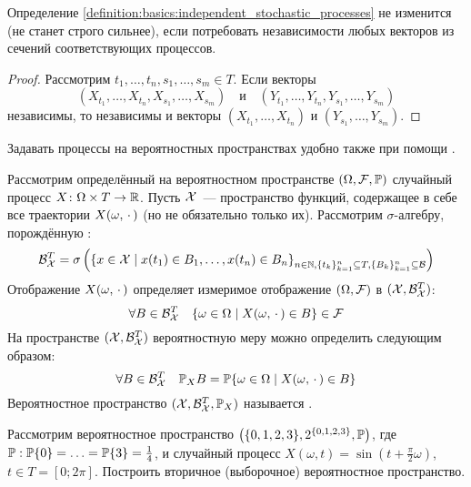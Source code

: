 \begin{remark}
    \label{remark:basics:independent_stochastic_processes}
    Определение \ref{definition:basics:independent_stochastic_processes} не изменится (не станет строго сильнее),
    если потребовать независимости любых векторов из сечений соответствующих процессов.
\end{remark}

\begin{proof}
    Рассмотрим $ t_1, \ldots, t_n, s_1, \ldots, s_m \in T $.
    Если векторы
    \[
        (X_{t_1}, \ldots, X_{t_n}, X_{s_1}, \ldots, X_{s_m}) \quad \text{и} \quad (Y_{t_1}, \ldots, Y_{t_n}, Y_{s_1}, \ldots, Y_{s_m})
    \]
    независимы, то независимы и векторы $ (X_{t_1}, \ldots, X_{t_n}) $ и $ (Y_{s_1}, \ldots, Y_{s_m}) $.
\end{proof}

Задавать процессы на вероятностных пространствах удобно также при помощи .

\begin{definition}
    \label{definition:basics:sampling_space}
    Рассмотрим определённый на вероятностном пространстве $ (\Omega, \mathcal{F}, \mathbb{P}) $ случайный процесс $ X \colon \Omega \times T \to \mathbb{R} $.
    Пусть $ \mathcal{X} $~--- пространство функций, содержащее в себе все траектории $ X(\omega, \, \cdot \,) $ (но не обязательно только их).
    Рассмотрим $ \sigma $-алгебру, порождённую :
    \[
        \mathcal{B}_{\mathcal{X}}^T =
        \sigma\left( \left\{ x \in \mathcal{X} \mid x(t_1) \in B_1, \ldots, x(t_n) \in B_n \right\}_{n \in \mathbb{N}, \{t_k\}_{k=1}^n \subseteq T, \{B_k\}_{k=1}^n \subseteq \mathcal{B}} \right)
    \]
    Отображение $ X(\omega, \, \cdot \,) $ определяет измеримое отображение $ (\Omega, \mathcal{F}) $ в $ (\mathcal{X}, \mathcal{B}_{\mathcal{X}}^T) $:
    \[
        \forall B \in \mathcal{B}_{\mathcal{X}}^T \quad \{ \omega \in \Omega \mid X(\omega, \, \cdot \,) \in B \} \in \mathcal{F}
    \]
    На пространстве $ (\mathcal{X}, \mathcal{B}_{\mathcal{X}}^T) $ вероятностную меру можно определить следующим образом:
    \[
        \forall B \in \mathcal{B}_{\mathcal{X}}^T \quad \mathbb{P}_X B = \mathbb{P} \{ \omega \in \Omega \mid X(\omega, \, \cdot \,) \in B \}
    \]
    Вероятностное пространство $ (\mathcal{X}, \mathcal{B}_{\mathcal{X}}^T, \mathbb{P}_X) $ называется .
\end{definition}

\begin{exercise}
    \label{exercise:basics:sampling_space}
    Рассмотрим вероятностное пространство $ \left( \{0, 1, 2, 3\}, 2^{\{0, 1, 2, 3\}}, \mathbb{P} \right) $,
    где $ \mathbb{P}: \mathbb{P} \{0\} = \ldots = \mathbb{P} \{3\} = \frac{1}{4} $,
    и случайный процесс $ X(\omega, t) = \sin\left( t + \frac{\pi}{2} \omega \right) $, $ t \in T = [0; 2 \pi] $.
    Построить вторичное (выборочное) вероятностное пространство.
\end{exercise}

